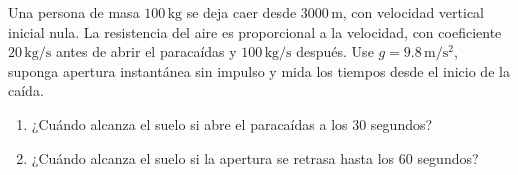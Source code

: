 Una persona de masa $100\,\mathrm{kg}$ se deja caer desde $3000\,\mathrm m$, con velocidad vertical inicial nula. La resistencia del aire es proporcional a la velocidad, con coeficiente $20\,\mathrm{kg/s}$ antes de abrir el paracaídas y $100\,\mathrm{kg/s}$ después. Use $g=9.8\,\mathrm{m/s^2}$, suponga apertura instantánea sin impulso y mida los tiempos desde el inicio de la caída.

\begin{enumerate}[label=(\alph*),ref=\alph*,leftmargin=*]
\item ¿Cuándo alcanza el suelo si abre el paracaídas a los $30$ segundos?
\item ¿Cuándo alcanza el suelo si la apertura se retrasa hasta los $60$ segundos?
\end{enumerate}
